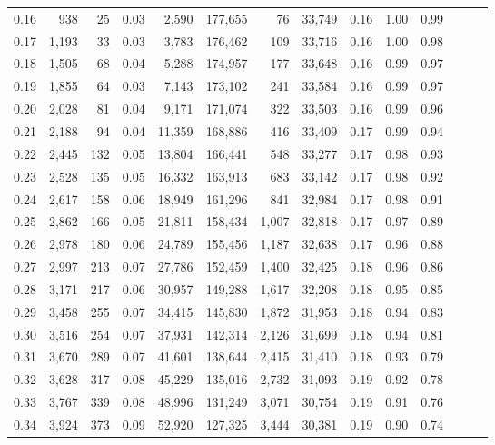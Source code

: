 \begin{tabular}{rrrrrrrrrrrrrr}
0.16 &    938 &   25 &  0.03 &    2,590 &  177,655 &      76 &  33,749 &  0.16 &  1.00 &      0.99 \\
0.17 &  1,193 &   33 &  0.03 &    3,783 &  176,462 &     109 &  33,716 &  0.16 &  1.00 &      0.98 \\
0.18 &  1,505 &   68 &  0.04 &    5,288 &  174,957 &     177 &  33,648 &  0.16 &  0.99 &      0.97 \\
0.19 &  1,855 &   64 &  0.03 &    7,143 &  173,102 &     241 &  33,584 &  0.16 &  0.99 &      0.97 \\
0.20 &  2,028 &   81 &  0.04 &    9,171 &  171,074 &     322 &  33,503 &  0.16 &  0.99 &      0.96 \\
0.21 &  2,188 &   94 &  0.04 &   11,359 &  168,886 &     416 &  33,409 &  0.17 &  0.99 &      0.94 \\
0.22 &  2,445 &  132 &  0.05 &   13,804 &  166,441 &     548 &  33,277 &  0.17 &  0.98 &      0.93 \\
0.23 &  2,528 &  135 &  0.05 &   16,332 &  163,913 &     683 &  33,142 &  0.17 &  0.98 &      0.92 \\
0.24 &  2,617 &  158 &  0.06 &   18,949 &  161,296 &     841 &  32,984 &  0.17 &  0.98 &      0.91 \\
0.25 &  2,862 &  166 &  0.05 &   21,811 &  158,434 &   1,007 &  32,818 &  0.17 &  0.97 &      0.89 \\
0.26 &  2,978 &  180 &  0.06 &   24,789 &  155,456 &   1,187 &  32,638 &  0.17 &  0.96 &      0.88 \\
0.27 &  2,997 &  213 &  0.07 &   27,786 &  152,459 &   1,400 &  32,425 &  0.18 &  0.96 &      0.86 \\
0.28 &  3,171 &  217 &  0.06 &   30,957 &  149,288 &   1,617 &  32,208 &  0.18 &  0.95 &      0.85 \\
0.29 &  3,458 &  255 &  0.07 &   34,415 &  145,830 &   1,872 &  31,953 &  0.18 &  0.94 &      0.83 \\
0.30 &  3,516 &  254 &  0.07 &   37,931 &  142,314 &   2,126 &  31,699 &  0.18 &  0.94 &      0.81 \\
0.31 &  3,670 &  289 &  0.07 &   41,601 &  138,644 &   2,415 &  31,410 &  0.18 &  0.93 &      0.79 \\
0.32 &  3,628 &  317 &  0.08 &   45,229 &  135,016 &   2,732 &  31,093 &  0.19 &  0.92 &      0.78 \\
0.33 &  3,767 &  339 &  0.08 &   48,996 &  131,249 &   3,071 &  30,754 &  0.19 &  0.91 &      0.76 \\
0.34 &  3,924 &  373 &  0.09 &   52,920 &  127,325 &   3,444 &  30,381 &  0.19 &  0.90 &      0.74 \\

\end{tabular}
